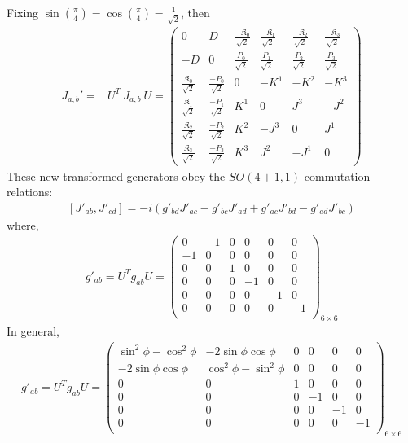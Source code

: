 \documentclass[]{article}
\numberwithin{equation}{section}
\begin{document}
{{Fixing $\sin{(\frac{\pi}{4})}=\cos{(\frac{\pi}{4})}=\frac{1}{\sqrt{2}}$, then
\begin{align}
    J_{a,b}'=&U^{T}~J_{a,b}~U=\begin{pmatrix}
  0&D&\frac{-\mathfrak{K}_0}{\sqrt{2}}&\frac{-\mathfrak{K}_1}{\sqrt{2}}&\frac{-\mathfrak{K}_2}{\sqrt{2}}&\frac{-\mathfrak{K}_3}{\sqrt{2}}\\
  -D&0&\frac{P_0}{\sqrt{2}}&\frac{P_1}{\sqrt{2}}&\frac{P_2}{\sqrt{2}}&\frac{P_3}{\sqrt{2}}\\
    \frac{\mathfrak{K}_0}{\sqrt{2}}&\frac{-P_0}{\sqrt{2}}&0 & -K^{1} & -K^{2} & -K^{3}\\
    \frac{\mathfrak{K}_1}{\sqrt{2}}&\frac{-P_1}{\sqrt{2}}&K^{1} & 0 & J^{3} & -J^{2}\\
    \frac{\mathfrak{K}_2}{\sqrt{2}}&\frac{-P_2}{\sqrt{2}}&K^{2} & -J^{3} & 0 & J^{1}\\
    \frac{\mathfrak{K}_3}{\sqrt{2}}&\frac{-P_3}{\sqrt{2}}&K^{3} & J^{2} & -J^{1} & 0
  \end{pmatrix}
\end{align}
These new transformed generators obey the $SO(4+1,1)$ commutation relations:
  \begin{align}
      \boxed{\left[J'_{{a}{b}},J'_{{c}{d}}\right]=-i\left(g'_{{b}{d}}J'_{{a}{c}}-g'_{{b}{c}}J'_{{a}{d}}+g'_{{a}{c}}J'_{{b}{d}}-g'_{{a}{d}}J'_{{b}{c}}\right)}
  \end{align}
  where, 
  \begin{align}
      g'_{ab}=U^Tg_{ab}U=\begin{pmatrix}
  0&-1&0&0&0&0\\
  -1&0&0&0&0&0\\
  0&0&1&0&0&0\\
  0&0&0&-1&0&0\\
  0&0&0&0&-1&0\\
  0&0&0&0&0&-1\\
  \end{pmatrix}_{6\times6}
  \end{align}
In general,
\begin{align}
      g'_{ab}=U^Tg_{ab}U=\begin{pmatrix}
  \sin^2{\phi}-\cos^2{\phi}&-2\sin{\phi}\cos{\phi}&0&0&0&0\\
  -2\sin{\phi}\cos{\phi}&\cos^2{\phi}-\sin^2{\phi}&0&0&0&0\\
  0&0&1&0&0&0\\
  0&0&0&-1&0&0\\
  0&0&0&0&-1&0\\
  0&0&0&0&0&-1\\
  \end{pmatrix}_{6\times6}
  \end{align}
  
}}
\end{document}
